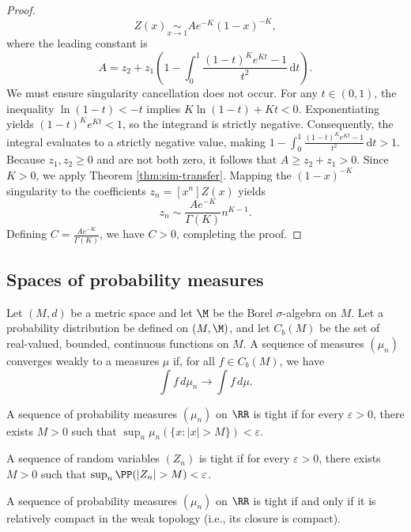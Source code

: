 \begin{proof}
  $$Z(x) \underset{x \to 1}{\sim} A e^{-K} (1-x)^{-K},$$
  where the leading constant is
  $$A = z_2 + z_1 \left( 1 - \int_0^1 \frac{(1-t)^K e^{Kt} - 1}{t^2} \, \mathrm{d}t \right).$$
  We must ensure singularity cancellation does not occur. For any $t \in (0, 1)$, the inequality $\ln(1-t) < -t$ implies $K\ln(1-t) + Kt < 0$. Exponentiating yields $(1-t)^K e^{Kt} < 1$, so the integrand is strictly negative. Consequently, the integral evaluates to a strictly negative value, making $1 - \int_0^1 \frac{(1-t)^K e^{Kt} - 1}{t^2} \, \mathrm{d}t > 1$. Because $z_1, z_2 \ge 0$ and are not both zero, it follows that $A \ge z_2 + z_1 > 0$. Since $K > 0$, we apply Theorem \ref{thm:sim-transfer}. Mapping the $(1-x)^{-K}$ singularity to the coefficients $z_n = [x^n]Z(x)$ yields
  $$z_n \sim \frac{A e^{-K}}{\Gamma(K)} n^{K-1}.$$
  Defining $C = \frac{A e^{-K}}{\Gamma(K)}$, we have $C > 0$, completing the proof.
\end{proof}

\subsection{Spaces of probability measures}
\label{subsec:supp-locally-convex-spaces}

\begin{definition}
  \label{def:weak-convergence}
  Let $(M,d)$ be a metric space and let $\M$ be the Borel $\sigma$-algebra on $M$. Let a probability distribution be defined on $(M, \M)$, and let $C_b(M)$ be the set of real-valued, bounded, continuous functions on $M$. A sequence of measures $(\mu_n)$ converges weakly to a measures $\mu$ if, for all $f\in C_b(M)$, we have
  $$\int f \, d\mu_n \to \int f \, d\mu.$$
\end{definition}

\begin{definition}[Tightness]
  \label{def:tight}
  A sequence of probability measures $(\mu_n)$ on $\RR$ is tight if for every $\varepsilon > 0$, there exists $M > 0$ such that $\sup_n \mu_n(\{x: |x| > M\}) < \varepsilon$.

  A sequence of random variables $(Z_n)$ is tight if for every $\varepsilon > 0$, there exists $M > 0$ such that $\sup_n\PP(|Z_n| > M) < \varepsilon$.
\end{definition}

\begin{theorem}
  \label{thm:prokhorov}
  A sequence of probability measures $(\mu_n)$ on $\RR$ is tight if and only if it is relatively compact in the weak topology (i.e., its closure is compact).
\end{theorem}

